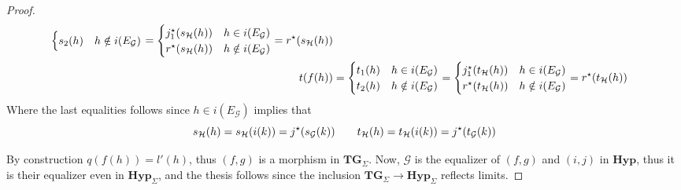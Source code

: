 \documentclass[runningheads,envcountsect]{lmcs}
\newcommand{\hyp}{\catname{Hyp}}
\newcommand{\catname}[1]{\mathbf{#1}}
\newcommand{\tg}[0]{\catname{TG}_{\Sigma}}
\theoremstyle{plain}
\theoremstyle{definition}
\begin{document}
\begin{proof}
\begin{align*}
\begin{cases}
	s_2(h) &h\notin i(E_{\mathcal{G}})
	\end{cases}=\begin{cases}
	j^\star_1(s_{\mathcal{H}}(h))&h\in i(E_{\mathcal{G}})\\
	r^\star(s_{\mathcal{H}}(h)) &h\notin i(E_{\mathcal{G}})
	\end{cases}=r^\star\qty(s_{\mathcal{H}}\qty(h))\\
	t(f(h))&=\begin{cases}
	t_1(h)&h\in i(E_{\mathcal{G}})\\
	t_2(h) &h\notin i(E_{\mathcal{G}})
	\end{cases}=\begin{cases}
	j^\star_1(t_{\mathcal{H}}(h))&h\in i(E_{\mathcal{G}})\\
	r^\star(t_{\mathcal{H}}(h)) &h\notin i(E_{\mathcal{G}})
	\end{cases}=r^\star\qty(t_{\mathcal{H}}\qty(h))
	\end{align*}
	Where the last equalities follows since $h\in i(E_{\mathcal{G}})$ implies that
	\[s_{\mathcal{H}}(h)=s_{\mathcal{H}}\qty(i\qty(k))=j^\star\qty(s_{\mathcal{G}}(k))\qquad t_{\mathcal{H}}(h)=t_{\mathcal{H}}\qty(i\qty(k))=j^\star\qty(t_{\mathcal{G}}(k))\]
	
	
	By construction
	$q(f(h))=l'(h)$, thus $(f,g)$ is a morphism in $\tg$. Now, $\mathcal{G}$ is the equalizer of $(f,g)$ and $(i,j)$ in $\hyp$, thus it is their equalizer even in $\hyp_{\Sigma}$, and the thesis follows since the inclusion $\tg\to \hyp_{\Sigma}$ reflects limits.
\end{proof}
\end{document}
